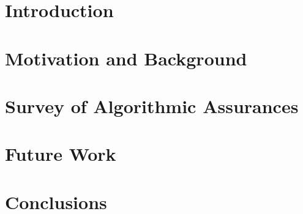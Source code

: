\documentclass[format=manuscript, screen,review=true]{acmart}
\begin{document}
\section{Introduction}\label{sec:introduction}


\section{Motivation and Background} \label{sec:background}


\section{Survey of Algorithmic Assurances} \label{sec:synthesis}


\section{Future Work} \label{sec:future_work}


\section{Conclusions}\label{sec:conclusions}




\end{document}
